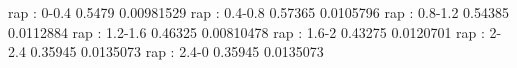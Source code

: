 rap : 0-0.4
0.5479 0.00981529
rap : 0.4-0.8
0.57365 0.0105796
rap : 0.8-1.2
0.54385 0.0112884
rap : 1.2-1.6
0.46325 0.00810478
rap : 1.6-2
0.43275 0.0120701
rap : 2-2.4
0.35945 0.0135073
rap : 2.4-0
0.35945 0.0135073
